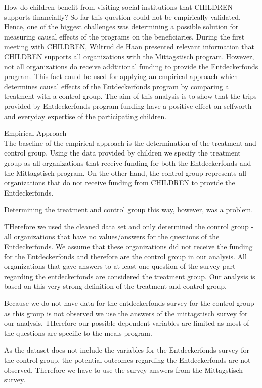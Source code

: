 \documentclass[12pt, a4paper]{article}\usepackage[]{graphicx}\usepackage[]{color}
\begin{document}
How do children benefit from visiting social institutions that CHILDREN supports financially? So far this question could not be empirically validated. Hence, one of the biggest challenges was determining a possible solution for measuring causal effects of the programs on the beneficiaries. During the first meeting with CHILDREN, Wiltrud de Haan presented relevant information that CHILDREN supports all organizations with the Mittagstisch program. However, not all organizations do receive addtitional funding to provide the Entdeckerfonds program. This fact could be used for applying an empirical approach which determines causal effects of the Entdeckerfonds program by comparing a treatment with a control group. The aim of this analysis is to show that the trips provided by Entdeckerfonds program funding have a positive effect on selfworth and everyday expertise of the participating children. 


Empirical Approach\\

The baseline of the empirical approach is the determination of the treatment and control group. Using the data provided by children we specify the treatment group as all organizations that receive funding for both the Entdeckerfonds and the Mittagstisch program. On the other hand, the control group represents all organizations that do not receive funding from CHILDREN to provide the Entdeckerfonds.

Determining the treatment and control group this way, however, was a problem.

THerefore we used the cleaned data set and only determined the control group - all organizations that have no values/answers for the questions of the Entdeckerfonds. We assume that these organizations did not receive the funding for the Entdeckerfonds and therefore are the control group in our analysis. All organizations that gave answers to at least one question of the survey part regarding the entdeckerfonds are considered the treatment group. 
Our analysis is based on this very strong definition of the treatment and control group.

Because we do not have data for the entdeckerfonds survey for the control group as this group is not observed we use the answers of the mittagstisch survey for our analysis. THerefore our possible dependent variables are limited as most of the questions are specific to the meals program. 

As the dataset does not include the variables for the Entdeckerfonds survey for the control group, the potential outcomes regarding the Entdeckerfonds are not observed. Therefore we have to use the survey answers from the Mittagstisch survey.
\end{document}
